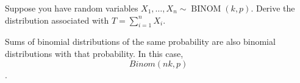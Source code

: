 \documentclass[answers]{exam}
\begin{document}
\begin{questions}
\question 
Suppose you have random variables \(X_1,\ldots,X_n \sim \operatorname{BINOM}(k,p)\). Derive the distribution associated with \(T=\sum_{i=1}^{n}X_i\).
\begin{solution}
	Sums of binomial distributions of the same probability are also 
	binomial distributions with that probability.
	In this case, \[Binom(nk,p)\].
\end{solution}

\end{questions}
\end{document}
